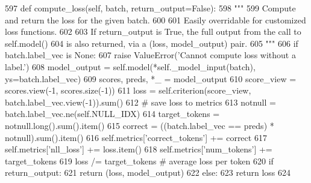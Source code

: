 \begin{DoxyCode}
597     \textcolor{keyword}{def }compute\_loss(self, batch, return\_output=False):
598         \textcolor{stringliteral}{"""}
599 \textcolor{stringliteral}{        Compute and return the loss for the given batch.}
600 \textcolor{stringliteral}{}
601 \textcolor{stringliteral}{        Easily overridable for customized loss functions.}
602 \textcolor{stringliteral}{}
603 \textcolor{stringliteral}{        If return\_output is True, the full output from the call to self.model()}
604 \textcolor{stringliteral}{        is also returned, via a (loss, model\_output) pair.}
605 \textcolor{stringliteral}{        """}
606         \textcolor{keywordflow}{if} batch.label\_vec \textcolor{keywordflow}{is} \textcolor{keywordtype}{None}:
607             \textcolor{keywordflow}{raise} ValueError(\textcolor{stringliteral}{'Cannot compute loss without a label.'})
608         model\_output = self.model(*self.\_model\_input(batch), ys=batch.label\_vec)
609         scores, preds, *\_ = model\_output
610         score\_view = scores.view(-1, scores.size(-1))
611         loss = self.criterion(score\_view, batch.label\_vec.view(-1)).sum()
612         \textcolor{comment}{# save loss to metrics}
613         notnull = batch.label\_vec.ne(self.NULL\_IDX)
614         target\_tokens = notnull.long().sum().item()
615         correct = ((batch.label\_vec == preds) * notnull).sum().item()
616         self.metrics[\textcolor{stringliteral}{'correct\_tokens'}] += correct
617         self.metrics[\textcolor{stringliteral}{'nll\_loss'}] += loss.item()
618         self.metrics[\textcolor{stringliteral}{'num\_tokens'}] += target\_tokens
619         loss /= target\_tokens  \textcolor{comment}{# average loss per token}
620         \textcolor{keywordflow}{if} return\_output:
621             \textcolor{keywordflow}{return} (loss, model\_output)
622         \textcolor{keywordflow}{else}:
623             \textcolor{keywordflow}{return} loss
624 
\end{DoxyCode}
\mbox{\label{classparlai_1_1core_1_1torch__generator__agent_1_1TorchGeneratorAgent_ac584268dd08c6fcb0045aa968cad8561}} 

